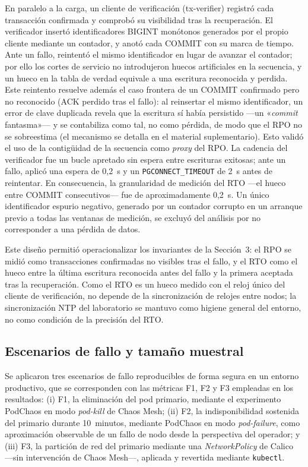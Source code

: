\documentclass[12pt,twocolumn,letterpaper]{article}
\begin{document}
En paralelo a la carga, un cliente de verificación (tx-verifier) registró cada transacción confirmada y comprobó su visibilidad tras la recuperación. El verificador insertó identificadores BIGINT monótonos generados por el propio cliente mediante un contador, y anotó cada COMMIT con su marca de tiempo. Ante un fallo, reintentó el mismo identificador en lugar de avanzar el contador; por ello los cortes de servicio no introdujeron huecos artificiales en la secuencia, y un hueco en la tabla de verdad equivale a una escritura reconocida y perdida. Este reintento resuelve además el caso frontera de un COMMIT confirmado pero no reconocido (ACK perdido tras el fallo): al reinsertar el mismo identificador, un error de clave duplicada revela que la escritura sí había persistido —un «\textit{commit} fantasma»— y se contabiliza como tal, no como pérdida, de modo que el RPO no se sobreestima (el mecanismo se detalla en el material suplementario). Esto validó el uso de la contigüidad de la secuencia como \textit{proxy} del RPO. La cadencia del verificador fue un bucle apretado sin espera entre escrituras exitosas; ante un fallo, aplicó una espera de 0,2~s y un \texttt{PGCONNECT\_TIMEOUT} de 2~s antes de reintentar. En consecuencia, la granularidad de medición del RTO —el hueco entre COMMIT consecutivos— fue de aproximadamente 0,2~s. Un único identificador espurio negativo, generado por un contador corrupto en un arranque previo a todas las ventanas de medición, se excluyó del análisis por no corresponder a una pérdida de datos.

Este diseño permitió operacionalizar los invariantes de la Sección~3: el RPO se midió como transacciones confirmadas no visibles tras el fallo, y el RTO como el hueco entre la última escritura reconocida antes del fallo y la primera aceptada tras la recuperación. Como el RTO es un hueco medido con el reloj único del cliente de verificación, no depende de la sincronización de relojes entre nodos; la sincronización NTP del laboratorio se mantuvo como higiene general del entorno, no como condición de la precisión del RTO.

\subsection{Escenarios de fallo y tamaño muestral}
Se aplicaron tres escenarios de fallo reproducibles de forma segura en un entorno productivo, que se corresponden con las métricas F1, F2 y F3 empleadas en los resultados: (i) F1, la eliminación del pod primario, mediante el experimento PodChaos en modo \textit{pod-kill} de Chaos Mesh; (ii) F2, la indisponibilidad sostenida del primario durante 10~minutos, mediante PodChaos en modo \textit{pod-failure}, como aproximación observable de un fallo de nodo desde la perspectiva del operador; y (iii) F3, la partición de red del primario mediante una \textit{NetworkPolicy} de Calico —sin intervención de Chaos Mesh—, aplicada y revertida mediante \texttt{kubectl}.
\end{document}
